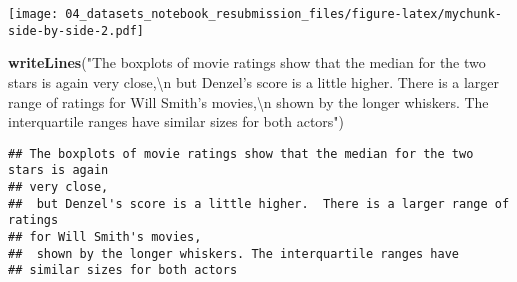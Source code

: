 \documentclass[
]{article}
\newenvironment{Shaded}{\begin{snugshade}}{\end{snugshade}}
\newcommand{\CharTok}[1]{\textcolor[rgb]{0.31,0.60,0.02}{#1}}
\newcommand{\DataTypeTok}[1]{\textcolor[rgb]{0.13,0.29,0.53}{#1}}
\newcommand{\DecValTok}[1]{\textcolor[rgb]{0.00,0.00,0.81}{#1}}
\newcommand{\KeywordTok}[1]{\textcolor[rgb]{0.13,0.29,0.53}{\textbf{#1}}}
\newcommand{\NormalTok}[1]{#1}
\newcommand{\OperatorTok}[1]{\textcolor[rgb]{0.81,0.36,0.00}{\textbf{#1}}}
\newcommand{\StringTok}[1]{\textcolor[rgb]{0.31,0.60,0.02}{#1}}
\begin{document}
\begin{Shaded}
\end{Shaded}

\texttt{[image: 04\_datasets\_notebook\_resubmission\_files/figure-latex/mychunk-side-by-side-2.pdf]}

\begin{Shaded}
\begin{Highlighting}[]
\KeywordTok{writeLines}\NormalTok{(}\StringTok{"The boxplots of movie ratings show that the median for the two stars is again }
\StringTok{very close,}\CharTok{\textbackslash{}n}\StringTok{ but Denzel's score is a little higher.  There is a larger range of ratings }
\StringTok{for Will Smith's movies,}\CharTok{\textbackslash{}n}\StringTok{ shown by the longer whiskers. The interquartile ranges have }
\StringTok{similar sizes for both actors"}\NormalTok{)}
\end{Highlighting}
\end{Shaded}

\begin{verbatim}
## The boxplots of movie ratings show that the median for the two stars is again 
## very close,
##  but Denzel's score is a little higher.  There is a larger range of ratings 
## for Will Smith's movies,
##  shown by the longer whiskers. The interquartile ranges have 
## similar sizes for both actors
\end{verbatim}

\begin{Shaded}
\end{Shaded}
\end{document}
